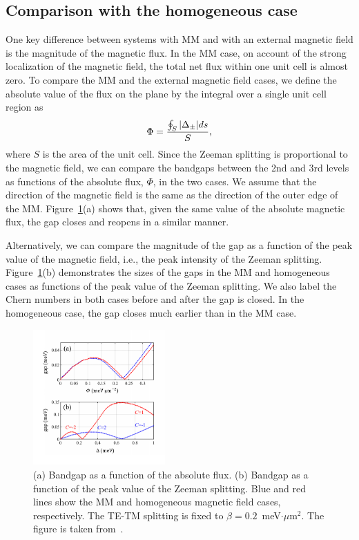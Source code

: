 \subsection{Comparison with the homogeneous case}
One key difference between systems with MM and with an external magnetic field is the magnitude of the magnetic flux.
In the MM case, on account of the strong localization of the magnetic field, the total net flux within one unit cell is almost zero.
To compare the MM and the external magnetic field cases, we define the absolute value of the flux on the plane by the integral over a single unit cell region as
%
\begin{equation}
    \Phi = \frac{\oint_S \abs{{\Delta_{\pm}}}ds}{S},
\end{equation}
%
where $S$ is the area of the unit cell.
Since the Zeeman splitting is proportional to the magnetic field, we can compare the bandgaps between the 2nd and 3rd levels as functions of the absolute flux, $\Phi$, in the two cases.
We assume that the direction of the magnetic field is the same as the direction of the outer edge of the MM.
Figure~\ref{fig:Ch5_gap}(a) shows that, given the same value of the absolute magnetic flux, the gap closes and reopens in a similar manner.

Alternatively, we can compare the magnitude of the gap as a function of the peak value of the magnetic field, i.e., the peak intensity of the Zeeman splitting.
Figure~\ref{fig:Ch5_gap}(b) demonstrates the sizes of the gaps in the MM and homogeneous cases as functions of the peak value of the Zeeman splitting.
We also label the Chern numbers in both cases before and after the gap is closed.
In the homogeneous case, the gap closes much earlier than in the MM case.
%
%
%
\begin{figure}[ht]
    \centering
    \includegraphics[width=0.45\textwidth]{Fig/Ch5/Fig3.pdf}
    \caption[Bandgap between MM and external magnetic field]{(a) Bandgap as a function of the absolute flux. (b) Bandgap as a function of the peak value of the Zeeman splitting. Blue and red lines show the MM and homogeneous magnetic field cases, respectively. The TE-TM splitting is fixed to $\beta = 0.2$~meV$\cdot\mu$m$^2$. The figure is taken from~\cite{Sun:2019ab}.}
    \label{fig:Ch5_gap}
\end{figure}
%
%
%


